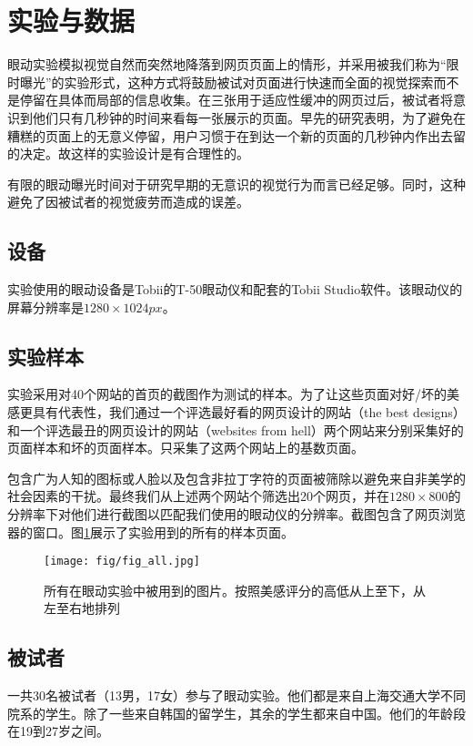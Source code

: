 \documentclass[master, fontset=mac, openany, oneside, zihao=-4]{sjtuthesis}
\begin{document}
\section{实验与数据}
眼动实验模拟视觉自然而突然地降落到网页页面上的情形，并采用被我们称为“限时曝光”的实验形式，这种方式将鼓励被试对页面进行快速而全面的视觉探索而不是停留在具体而局部的信息收集。在三张用于适应性缓冲的网页过后，被试者将意识到他们只有几秒钟的时间来看每一张展示的页面。早先的研究表明，为了避免在糟糕的页面上的无意义停留，用户习惯于在到达一个新的页面的几秒钟内作出去留的决定\cite{Liu2010}。故这样的实验设计是有合理性的。

有限的眼动曝光时间对于研究早期的无意识的视觉行为而言已经足够。同时，这种避免了因被试者的视觉疲劳而造成的误差。

\subsection{设备}
实验使用的眼动设备是Tobii的T-50眼动仪和配套的Tobii Studio软件。该眼动仪的屏幕分辨率是$1280\times1024px$。

\subsection{实验样本}
实验采用对40个网站的首页的截图作为测试的样本。为了让这些页面对好/坏的美感更具有代表性，我们通过一个评选最好看的网页设计的网站（the best designs）和一个评选最丑的网页设计的网站（websites from hell）两个网站来分别采集好的页面样本和坏的页面样本。只采集了这两个网站上的基数页面。

包含广为人知的图标或人脸以及包含非拉丁字符的页面被筛除以避免来自非美学的社会因素的干扰。最终我们从上述两个网站个筛选出20个网页，并在$1280\times800$的分辨率下对他们进行截图以匹配我们使用的眼动仪的分辨率。截图包含了网页浏览器的窗口。图\ref{fig:all}展示了实验用到的所有的样本页面。

\begin{figure}
  \label{fig:all}
  \centering
  \texttt{[image: fig/fig\_all.jpg]}
  \caption{所有在眼动实验中被用到的图片。按照美感评分的高低从上至下，从左至右地排列}
\end{figure}

\subsection{被试者}
一共30名被试者（13男，17女）参与了眼动实验。他们都是来自上海交通大学不同院系的学生。除了一些来自韩国的留学生，其余的学生都来自中国。他们的年龄段在19到27岁之间。
\end{document}
